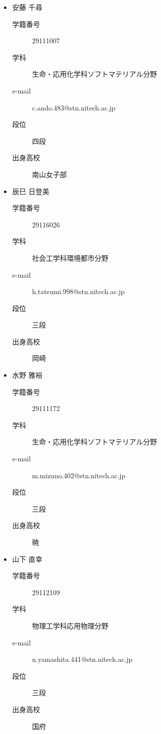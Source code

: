 \documentclass[a4paper,11pt,dvipdfmx]{jsarticle}
\begin{document}
\begin{itemize}
    \item 安藤 千尋
    \begin{description}
        \item[学籍番号]29111007
        \item[学科] 生命・応用化学科ソフトマテリアル分野
        \item[e-mail]c.ando.483@stn.nitech.ac.jp
        \item[段位]四段
        \item[出身高校]南山女子部 
    \end{description}
\end{itemize}
\begin{itemize}
    \item 辰巳 日登美
    \begin{description}
        \item[学籍番号]29116026
        \item[学科] 社会工学科環境都市分野
        \item[e-mail]h.tatsumi.998@stn.nitech.ac.jp
        \item[段位]三段
        \item[出身高校]岡崎 
    \end{description}
\end{itemize}
\begin{itemize}
    \item 水野 雅裕
    \begin{description}
        \item[学籍番号]29111172
        \item[学科] 生命・応用化学科ソフトマテリアル分野
        \item[e-mail]m.mizuno.402@stn.nitech.ac.jp
        \item[段位]三段
        \item[出身高校]暁 
    \end{description}
\end{itemize}
\begin{itemize}
    \item 山下 直幸
    \begin{description}
        \item[学籍番号]29112109
        \item[学科] 物理工学科応用物理分野
        \item[e-mail]n.yamashita.441@stn.nitech.ac.jp
        \item[段位]三段
        \item[出身高校]国府 
    \end{description}
\end{itemize}
\end{document}
